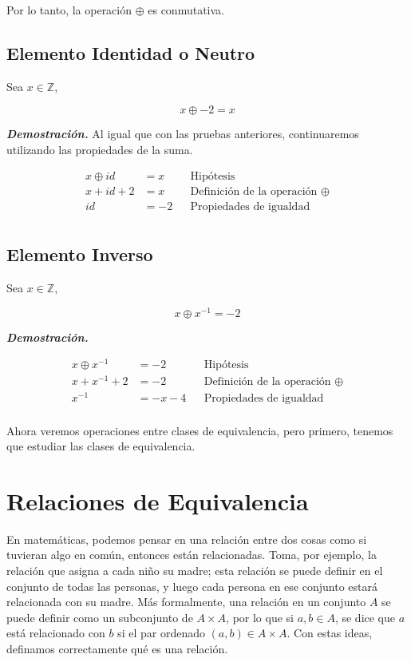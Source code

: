 \documentclass{report}
\begin{document}
Por lo tanto, la operación $\oplus$ es conmutativa.

\subsection*{Elemento Identidad o Neutro}

Sea $x \in \mathbb{Z}$,

$$x\oplus -2 = x $$

\textit{\textbf{Demostración.}} Al igual que con las pruebas anteriores, continuaremos utilizando las propiedades de la suma.

\begin{align*}
    x\oplus id &= x &&\text{Hipótesis}\\
    x + id + 2 &= x &&\text{Definición de la operación } \oplus\\
    id &= -2  &&\text{Propiedades de igualdad}\\
\end{align*}

\subsection*{Elemento Inverso}

Sea $x \in \mathbb{Z}$,

$$x\oplus x^{-1} = -2 $$

\textit{\textbf{Demostración.}}

\begin{align*}
    x\oplus x^{-1} &= -2 &&\text{Hipótesis}\\
    x + x^{-1} + 2 &= -2 &&\text{Definición de la operación } \oplus\\
    x^{-1} &= -x -4  &&\text{Propiedades de igualdad}\\
\end{align*}

Ahora veremos operaciones entre clases de equivalencia, pero primero, tenemos que estudiar las clases de equivalencia.

\section{Relaciones de Equivalencia}

En matemáticas, podemos pensar en una relación entre dos cosas como si tuvieran algo en común, entonces están relacionadas. Toma, por ejemplo, la relación que asigna a cada niño su madre; esta relación se puede definir en el conjunto de todas las personas, y luego cada persona en ese conjunto estará relacionada con su madre. Más formalmente, una relación en un conjunto $A$ se puede definir como un subconjunto de $A \times A$, por lo que si $a, b \in A$, se dice que $a$ está relacionado con $b$ si el par ordenado $(a,b) \in A\times A$. Con estas ideas, definamos correctamente qué es una relación.\\
\end{document}
